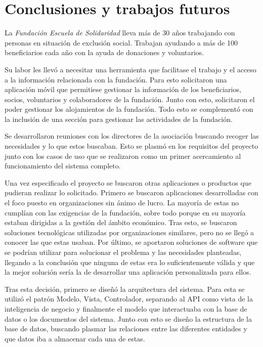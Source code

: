 \chapter{Conclusiones y trabajos futuros}

La \textit{Fundación Escuela de Solidaridad} lleva más de 30 años trabajando con personas en situación de exclusión social. Trabajan ayudando a más de 100 beneficiarios cada año con la ayuda de donaciones y voluntarios.

Su labor les llevó a necesitar una herramienta que facilitase el trabajo y el acceso a la información relacionada con la fundación. Para esto solicitaron una aplicación móvil que permitiese gestionar la información de los beneficiarios, socios, voluntarios y colaboradores de la fundación. Junto con esto, solicitaron el poder gestionar los alojamientos de la fundación. Todo esto se complementó con la inclusión de una sección para gestionar las actividades de la fundación. 

Se desarrollaron reuniones con los directores de la asociación buscando recoger las necesidades y lo que estos buscaban. Esto se plasmó en los requisitos del proyecto junto con los casos de uso que se realizaron como un primer acercamiento al funcionamiento del sistema completo. 

Una vez especificado el proyecto se buscaron otras aplicaciones o productos que pudieran realizar lo solicitado. Primero se buscaron aplicaciones desarrolladas con el foco puesto en organizaciones sin ánimo de lucro. La mayoría de estas no cumplían con las exigencias de la fundación, sobre todo porque en su mayoría estaban dirigidas a la gestión del ámbito económico. Tras esto, se buscaron soluciones tecnológicas utilizadas por organizaciones similares, pero no se llegó a conocer las que estas usaban. Por último, se aportaron soluciones de software que se podrían utilizar para solucionar el problema y las necesidades planteadas, llegando a la conclusión que ninguna de estas era lo suficientemente válida y que la mejor solución sería la de desarrollar una aplicación personalizada para ellos. 

Tras esta decisión, primero se diseñó la arquitectura del sistema. Para esta se utilizó el patrón Modelo, Vista, Controlador, separando al API como vista de la inteligencia de negocio y finalmente el modelo que interactuaba con la base de datos o los documentos del sistema. Junto con esto se diseño la estructura de la base de datos, buscando plasmar las relaciones entre las diferentes entidades y que datos iba a almacenar cada una de estas. 

